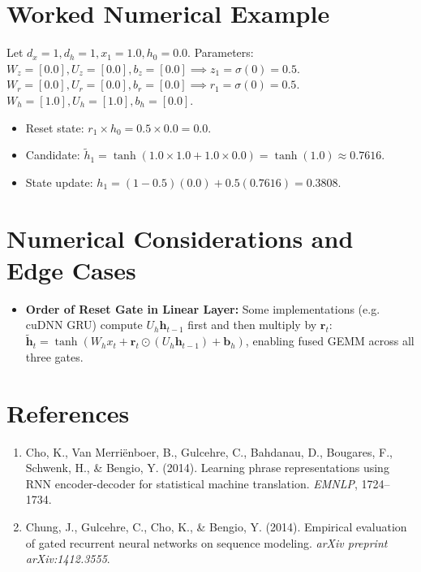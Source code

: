 \documentclass[11pt,a4paper]{article}
\theoremstyle{definition}
\begin{document}
\section{Worked Numerical Example}

Let $d_x = 1, d_h = 1, x_1 = 1.0, h_0 = 0.0$.
Parameters:
$W_z = [0.0], U_z = [0.0], b_z = [0.0] \implies z_1 = \sigma(0) = 0.5$.
$W_r = [0.0], U_r = [0.0], b_r = [0.0] \implies r_1 = \sigma(0) = 0.5$.
$W_h = [1.0], U_h = [1.0], b_h = [0.0]$.
\begin{itemize}
    \item Reset state: $r_1 \times h_0 = 0.5 \times 0.0 = 0.0$.
    \item Candidate: $\tilde{h}_1 = \tanh(1.0 \times 1.0 + 1.0 \times 0.0) = \tanh(1.0) \approx 0.7616$.
    \item State update: $h_1 = (1 - 0.5)(0.0) + 0.5(0.7616) = 0.3808$.
\end{itemize}

\section{Numerical Considerations and Edge Cases}

\begin{itemize}
    \item \textbf{Order of Reset Gate in Linear Layer:} Some implementations (e.g. cuDNN GRU) compute $U_h \mathbf{h}_{t-1}$ first and then multiply by $\mathbf{r}_t$: $\tilde{\mathbf{h}}_t = \tanh(W_h x_t + \mathbf{r}_t \odot (U_h \mathbf{h}_{t-1}) + \mathbf{b}_h)$, enabling fused GEMM across all three gates.
\end{itemize}

\section{References}
\begin{enumerate}
    \item Cho, K., Van Merri{\"e}nboer, B., Gulcehre, C., Bahdanau, D., Bougares, F., Schwenk, H., \& Bengio, Y. (2014). Learning phrase representations using RNN encoder-decoder for statistical machine translation. \emph{EMNLP}, 1724--1734.
    \item Chung, J., Gulcehre, C., Cho, K., \& Bengio, Y. (2014). Empirical evaluation of gated recurrent neural networks on sequence modeling. \emph{arXiv preprint arXiv:1412.3555}.
\end{enumerate}
\end{document}
